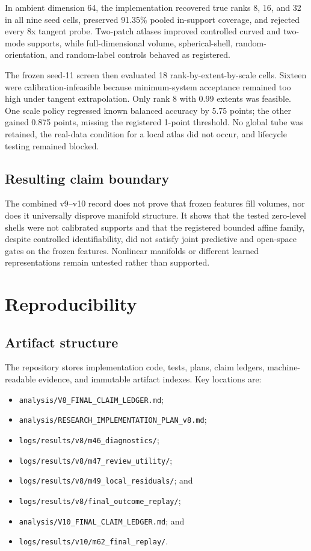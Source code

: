 \documentclass[12pt,oneside]{report}
\begin{document}
In ambient dimension 64, the implementation recovered true ranks 8, 16, and 32
in all nine seed cells, preserved 91.35\% pooled in-support coverage, and
rejected every 8x tangent probe. Two-patch atlases improved controlled curved
and two-mode supports, while full-dimensional volume, spherical-shell,
random-orientation, and random-label controls behaved as registered.

The frozen seed-11 screen then evaluated 18 rank-by-extent-by-scale cells.
Sixteen were calibration-infeasible because minimum-system acceptance remained
too high under tangent extrapolation. Only rank 8 with 0.99 extents was
feasible. One scale policy regressed known balanced accuracy by 5.75 points;
the other gained 0.875 points, missing the registered 1-point threshold. No
global tube was retained, the real-data condition for a local atlas did not
occur, and lifecycle testing remained blocked.

\section{Resulting claim boundary}

The combined v9--v10 record does not prove that frozen features fill volumes,
nor does it universally disprove manifold structure. It shows that the tested
zero-level shells were not calibrated supports and that the registered bounded
affine family, despite controlled identifiability, did not satisfy joint
predictive and open-space gates on the frozen features. Nonlinear manifolds or
different learned representations remain untested rather than supported.

\chapter{Reproducibility}

\section{Artifact structure}

The repository stores implementation code, tests, plans, claim ledgers,
machine-readable evidence, and immutable artifact indexes. Key locations are:

\begin{itemize}
\item \texttt{analysis/V8\_FINAL\_CLAIM\_LEDGER.md};
\item \texttt{analysis/RESEARCH\_IMPLEMENTATION\_PLAN\_v8.md};
\item \texttt{logs/results/v8/m46\_diagnostics/};
\item \texttt{logs/results/v8/m47\_review\_utility/};
\item \texttt{logs/results/v8/m49\_local\_residuals/}; and
\item \texttt{logs/results/v8/final\_outcome\_replay/};
\item \texttt{analysis/V10\_FINAL\_CLAIM\_LEDGER.md}; and
\item \texttt{logs/results/v10/m62\_final\_replay/}.
\end{itemize}
\end{document}
